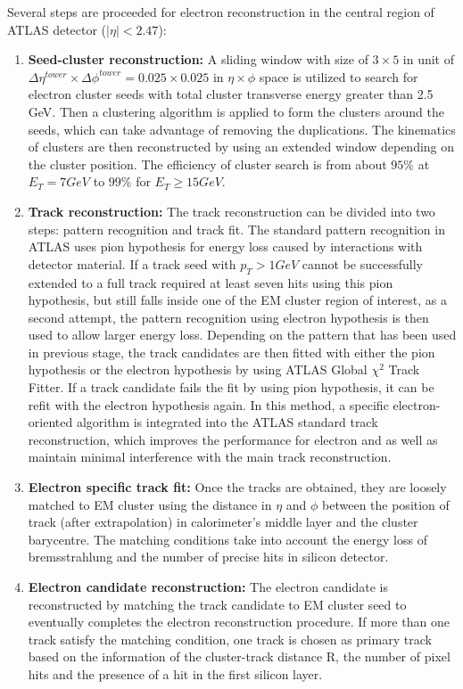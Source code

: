 Several steps are proceeded for electron reconstruction in the central region of ATLAS detector ($|\eta| < 2.47$):
\begin{enumerate}
	\item \textbf{Seed-cluster reconstruction:} A sliding window with size of $3 \times 5$ in unit of $\Delta\eta^{tower} \times \Delta\phi^{tower} = 0.025 \times 0.025$ in $\eta \times \phi$ space is utilized to search for electron cluster seeds with total cluster transverse energy greater than 2.5 GeV. Then a clustering algorithm\cite{Lampl:1099735} is applied to form the clusters around the seeds, which can take advantage of removing the duplications. The kinematics of clusters are then reconstructed by using an extended window depending on the cluster position. The efficiency of cluster search is from about $95\%$ at $E_{T} = 7 GeV$ to $99\%$ for $E_{T} \geq 15 GeV$.
	\item \textbf{Track reconstruction:} The track reconstruction can be divided into two steps: pattern recognition and track fit. The standard pattern recognition in ATLAS uses pion hypothesis for energy loss caused by interactions with detector material. If a track seed with $p_{T} > 1 GeV$ cannot be successfully extended to a full track required at least seven hits using this pion hypothesis, but still falls inside one of the EM cluster region of interest, as a second attempt, the pattern recognition using electron hypothesis is then used to allow larger energy loss.
Depending on the pattern that has been used in previous stage, the track candidates are then fitted with either the pion hypothesis or the electron hypothesis by using ATLAS Global $\chi^{2}$ Track Fitter\cite{Cornelissen_2008}. If a track candidate fails the fit by using pion hypothesis, it can be refit with the electron hypothesis again. In this method, a specific electron-oriented algorithm is integrated into the ATLAS standard track reconstruction, which improves the performance for electron and as well as maintain minimal interference with the main track reconstruction. 
	\item \textbf{Electron specific track fit:} Once the tracks are obtained, they are loosely matched to EM cluster using the distance in $\eta$ and $\phi$ between the position of track (after extrapolation) in calorimeter's middle layer and the cluster barycentre. The matching conditions take into account the energy loss of bremsstrahlung and the number of precise hits in silicon detector.
	\item \textbf{Electron candidate reconstruction:} The electron candidate is reconstructed by matching the track candidate to EM cluster seed to eventually completes the electron reconstruction procedure. If more than one track satisfy the matching condition, one track is chosen as primary track based on the information of the cluster-track distance R, the number of pixel hits and the presence of a hit in the first silicon layer\cite{ATLAS-CONF-2014-032}.

\end{enumerate}
